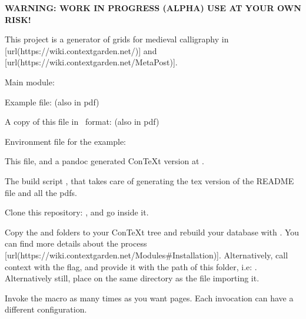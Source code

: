 \startchapter[title={A Calligraphy Grid in ConTeXt/LMTX},reference={a-calligraphy-grid-in-contextlmtx}]

{\bf WARNING: WORK IN PROGRESS (ALPHA) USE AT YOUR OWN RISK!}

This project is a generator of grids for medieval calligraphy in [url(https://wiki.contextgarden.net/)] and [url(https://wiki.contextgarden.net/MetaPost)].

\startsection[title={Files included},reference={files-included}]

\startitemize[packed]
\item
  Main module: 
\item
  Example file:  (also in pdf)
\item
  A copy of this file in \CONTEXT~format:  (also in pdf)
\item
  Environment file for the example: 
\item
  This  file, and a pandoc generated ConTeXt version at .
\item
  The build script , that takes care of generating the tex version of the README file and all the pdfs.
\stopitemize

\stopsection

\startsection[title={Use},reference={use}]

\startenumerate[n,packed][stopper=.]
\item
  Clone this repository: , and go inside it.
\item
  Copy the  and  folders to your ConTeXt tree and rebuild your database with . You can find more details about the process [url(https://wiki.contextgarden.net/Modules\#Installation)]. Alternatively, call context with the  flag, and provide it with the path of this folder, i.e: . Alternatively still, place  on the same directory as the file importing it.
\item
  Invoke the \type{\Pauta} macro as many times as you want pages. Each invocation can have a different configuration.
\stopenumerate

\stopsection

